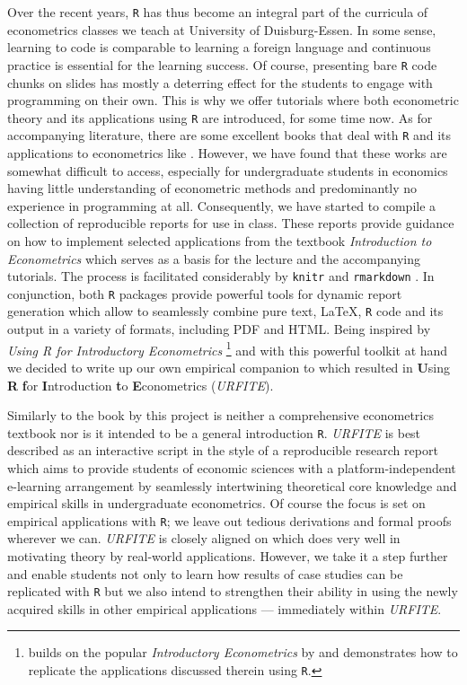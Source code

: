 \documentclass[]{book}
\let\rmarkdownfootnote\footnote%
\def\footnote{\protect\rmarkdownfootnote}
\theoremstyle{definition}
\theoremstyle{definition}
\theoremstyle{definition}
\theoremstyle{remark}
\begin{document}
Over the recent years, \texttt{R} has thus become an integral part of
the curricula of econometrics classes we teach at University of
Duisburg-Essen. In some sense, learning to code is comparable to
learning a foreign language and continuous practice is essential for the
learning success. Of course, presenting bare \texttt{R} code chunks on
slides has mostly a deterring effect for the students to engage with
programming on their own. This is why we offer tutorials where both
econometric theory and its applications using \texttt{R} are introduced,
for some time now. As for accompanying literature, there are some
excellent books that deal with \texttt{R} and its applications to
econometrics like \citet{kleiber2008}. However, we have found that these
works are somewhat difficult to access, especially for undergraduate
students in economics having little understanding of econometric methods
and predominantly no experience in programming at all. Consequently, we
have started to compile a collection of reproducible reports for use in
class. These reports provide guidance on how to implement selected
applications from the textbook \emph{Introduction to Econometrics}
\citep{stock2015} which serves as a basis for the lecture and the
accompanying tutorials. The process is facilitated considerably by
\texttt{knitr} \citep{R-knitr} and \texttt{rmarkdown}
\citep{R-rmarkdown}. In conjunction, both \texttt{R} packages provide
powerful tools for dynamic report generation which allow to seamlessly
combine pure text, LaTeX, \texttt{R} code and its output in a variety of
formats, including PDF and HTML. Being inspired by \emph{Using R for
Introductory Econometrics} \citep{heiss2016}\footnote{\citet{heiss2016}
  builds on the popular \emph{Introductory Econometrics} by
  \citet{wooldridge2016} and demonstrates how to replicate the
  applications discussed therein using \texttt{R}.} and with this
powerful toolkit at hand we decided to write up our own empirical
companion to \citet{stock2015} which resulted in \textbf{U}sing
\textbf{R} \textbf{f}or \textbf{I}ntroduction \textbf{t}o
\textbf{E}conometrics (\emph{URFITE}).

Similarly to the book by \citet{heiss2016} this project is neither a
comprehensive econometrics textbook nor is it intended to be a general
introduction \texttt{R}. \emph{URFITE} is best described as an
interactive script in the style of a reproducible research report which
aims to provide students of economic sciences with a
platform-independent e-learning arrangement by seamlessly intertwining
theoretical core knowledge and empirical skills in undergraduate
econometrics. Of course the focus is set on empirical applications with
\texttt{R}; we leave out tedious derivations and formal proofs wherever
we can. \emph{URFITE} is closely aligned on \citet{stock2015} which does
very well in motivating theory by real-world applications. However, we
take it a step further and enable students not only to learn how results
of case studies can be replicated with \texttt{R} but we also intend to
strengthen their ability in using the newly acquired skills in other
empirical applications --- immediately within \emph{URFITE}.
\end{document}
